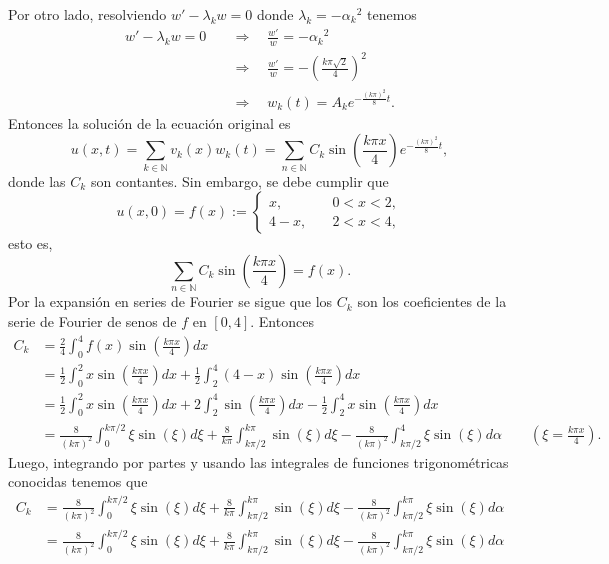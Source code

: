 \documentclass[12pt]{article}
\newcommand{\N}{\mathbb{N}}
\newcommand{\pp}[1]{\left( #1 \right)}
\newcommand{\Imp}{\quad\Longrightarrow\quad}
\renewcommand{\l}{\lambda}
\renewcommand{\a}{\alpha}
\begin{document}
\begin{enumerate}
\begin{enumerate}
            Por otro lado, resolviendo $w'-\l_k w=0$ donde $\l_k=-{\a_k}^2$ tenemos
            \begin{align*}
                w'-\l_k w=0 &\Imp \frac{w'}{w}=-{\a_k}^2\\
                &\Imp \frac{w'}{w}=-\pp{\frac{k\pi\sqrt{2}}{4}}^2\\
                &\Imp w_k(t)= A_ke^{-\frac{(k\pi)^2}{8}t}.
            \end{align*}
            Entonces la solución de la ecuación original es
            \[ u(x,t) = \sum_{k\in\N}v_k(x)w_k(t)=\sum_{n\in\N}C_k\sin\pp{\frac{k\pi x}{4}}e^{-\frac{(k\pi)^2}{8}t}, \]
            donde las $C_k$ son contantes. Sin embargo, se debe cumplir que
            \[u(x,0) = f(x):=\begin{cases}
                x,\quad   &0<x<2,\\
                4-x,\quad &2<x<4,
            \end{cases} \]
            esto es,
            \[
            \sum_{n\in\N}C_k\sin\pp{\frac{k\pi x}{4}}= f(x). \]
            Por la expansión en series de Fourier se sigue que los $C_k$ son los coeficientes de la serie de Fourier de senos de $f$ en $[0,4]$. Entonces
            \begin{align*}
                C_k &= \frac{2}{4}\int_0^4 f(x)\sin\pp{\frac{k\pi x}{4}}dx\\
                &= \frac{1}{2}\int_0^2 x\sin\pp{\frac{k\pi x}{4}}dx+\frac{1}{2}\int_2^4 (4-x)\sin\pp{\frac{k\pi x}{4}}dx\\
                &= \frac{1}{2}\int_0^2 x\sin\pp{\frac{k\pi x}{4}}dx+2\int_2^4\sin\pp{\frac{k\pi x}{4}}dx-\frac{1}{2}\int_2^4x\sin\pp{\frac{k\pi x}{4}}dx\\
                &= \frac{8}{(k\pi)^2}\int_0^{k\pi/2} \xi\sin(\xi)d\xi+\frac{8}{k\pi}\int_{k\pi/2}^{k\pi}\sin(\xi)d\xi-\frac{8}{(k\pi)^2}\int_{k\pi/2}^4\xi\sin(\xi)d\a\qquad (\xi=\tfrac{k\pi x}{4}).
            \end{align*}
            Luego, integrando por partes y usando las integrales de funciones trigonométricas conocidas tenemos que
            \begin{align*}
                C_k &= \frac{8}{(k\pi)^2}\int_0^{k\pi/2} \xi\sin(\xi)d\xi+\frac{8}{k\pi}\int_{k\pi/2}^{k\pi}\sin(\xi)d\xi-\frac{8}{(k\pi)^2}\int_{k\pi/2}^{k\pi}\xi\sin(\xi)d\a\\
                &= \frac{8}{(k\pi)^2}\int_0^{k\pi/2} \xi\sin(\xi)d\xi+\frac{8}{k\pi}\int_{k\pi/2}^{k\pi}\sin(\xi)d\xi-\frac{8}{(k\pi)^2}\int_{k\pi/2}^{k\pi}\xi\sin(\xi)d\a\\

\end{align*}
\end{enumerate}
\end{enumerate}
\end{document}
